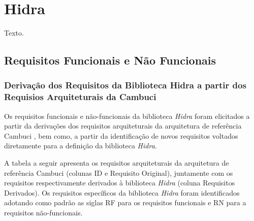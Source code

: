 \chapter{Hidra} \label{chapter:hidra}

Texto.

\section{Requisitos Funcionais e Não Funcionais}
\subsection{Derivação dos Requisitos da Biblioteca Hidra a partir dos Requisios Arquiteturais da Cambuci} \label{section:sec1}

Os requisitos funcionais e não-funcionais da biblioteca \textit{Hidra} foram elicitados a partir da derivações dos requisitos arquiteturais da arquitetura de referência Cambuci \cite{dissertacaoOsshiro2014}, bem como, a partir da identificação de novos requisitos voltados diretamente para a definição da biblioteca \textit{Hidra}.

A tabela a seguir apresenta os requisitos arquiteturais da arquitetura de referência Cambuci (colunas ID e Requisito Original), juntamente com os requisitos respectivamente derivados à biblioteca \textit{Hidra} (coluna Requisitos Derivados). Os requisitos específicos da biblioteca \textit{Hidra} foram identificados adotando como padrão as siglas RF para os requisitos funcionais e RN para a requisitos não-funcionais.

\newpage







